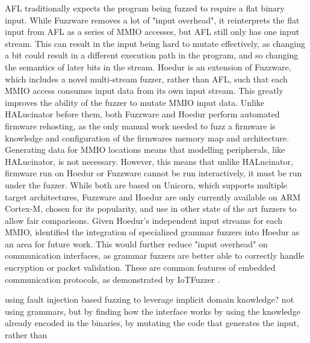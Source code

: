 \documentclass[../report.tex]{subfiles}
\begin{document}
AFL traditionally expects the program being fuzzed to require a flat binary input.
While Fuzzware removes a lot of "input overhead", it reinterprets the flat
input from AFL as a series of MMIO accesses, but AFL still only has one input
stream. This can result in the input being hard to mutate effectively, as
changing a bit could result in a different execution path in the program, and
so changing the semantics of later bits in the stream.
Hoedur \citep{Hoedur_2023} is an extension of Fuzzware, which includes a novel
multi-stream fuzzer, rather than AFL, such that each MMIO access consumes input
data from its own input stream. This greatly improves the ability of the fuzzer
to mutate MMIO input data. Unlike HALucinator before them, both Fuzzware and
Hoedur perform automated firmware rehosting, as the only manual work needed to
fuzz a firmware is knowledge and configuration of the firmwares memory map and
architecture. Generating data for MMIO locations means that modelling
peripherals, like HALucinator, is not necessary. However, this means that
unlike HALucinator, firmware run on Hoedur or Fuzzware cannot be run
interactively, it must be run under the fuzzer. While both are based on
Unicorn, which supports multiple target architectures, Fuzzware and Hoedur are
only currently available on ARM Cortex-M, chosen for its popularity, and use in
other state of the art fuzzers to allow fair comparisons. Given Hoedur's
independent input streams for each MMIO, \citet{Hoedur_2023} identified the
integration of specialized grammar fuzzers into Hoedur as an area for future
work. This would further reduce "input overhead" on communication interfaces,
as grammar fuzzers are better able to correctly handle encryption or packet
validation. These are common features of embedded communication protocols, as
demonstrated by IoTFuzzer \citep{IOTFuzzer_2018}.

\citet{Fuzztruction_2023} using fault injection based fuzzing to leverage implicit domain knowledge? not using grammars, but by finding how the interface works by using the knowledge already encoded in the binaries, by mutating the code that generates the input, rather than
\end{document}
